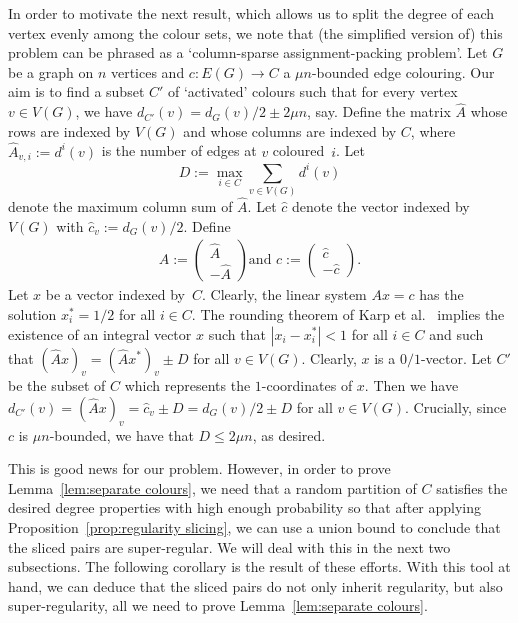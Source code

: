 \documentclass[10pt]{amsart}
\theoremstyle{definition}
\theoremstyle{claimstyle}
\theoremstyle{stepstyle}
\numberwithin{equation}{section}
\begin{document}
In order to motivate the next result, which allows us to split the degree of each vertex evenly among the colour sets, we note that (the simplified version of) this problem can be phrased as a `column-sparse assignment-packing problem'. Let $G$ be a graph on $n$ vertices and $c\colon E(G)\to C$ a $\mu n$-bounded edge colouring. Our aim is to find a subset $C'$ of `activated' colours such that for every vertex $v\in V(G)$, we have $d_{C'}(v)=d_G(v)/2\pm 2\mu n$, say.
Define the matrix $\hat{A}$ whose rows are indexed by $V(G)$ and whose columns are indexed by $C$, where $\hat{A}_{v,i}:=d^i(v)$ is the number of edges at $v$ coloured~$i$.
Let $$D:=\max_{i\in C}\sum_{v\in V(G)}d^i(v)$$ denote the maximum column sum of $\hat{A}$.
Let $\hat{c}$ denote the vector indexed by $V(G)$ with $\hat{c}_v:=d_G(v)/2$. Define 
\begin{align*}
	\text{$A:=
	\left(
	\begin{array}{c}
	\hat{A}\\
	-\hat{A}
	\end{array}
	\right)$
	and $c:=
	\left(
	\begin{array}{c}
	\hat{c}\\
	-\hat{c}
	\end{array}
\right)$.}
\end{align*}
Let $x$ be a vector indexed by~$C$.
Clearly, the linear system $Ax=c$ has the solution $x_i^\ast=1/2$ for all $i\in C$. The rounding theorem of Karp et al.~\cite{KLRTVV:87} implies the existence of an integral vector $x$ such that $|x_i-x^\ast_i|<1$ for all $i\in C$ and such that $(\hat{A}x)_v= (\hat{A} x^\ast)_v \pm D$ for all $v\in V(G)$. Clearly, $x$ is a $0/1$-vector.
Let $C'$ be the subset of $C$ which represents the $1$-coordinates of $x$. Then we have $d_{C'}(v)=(\hat{A}x)_v=\hat{c}_v\pm D=d_G(v)/2\pm D$ for all $v\in V(G)$. Crucially, since $c$ is $\mu n$-bounded, we have that $D\le 2\mu n$, as desired.

This is good news for our problem. However, in order to prove Lemma~\ref{lem:separate colours}, we need that a random partition of $C$ satisfies the desired degree properties with high enough probability so that after applying Proposition~\ref{prop:regularity slicing}, we can use a union bound to conclude that the sliced pairs are super-regular.
We will deal with this in the next two subsections.
The following corollary is the result of these efforts.
With this tool at hand, we can deduce that the sliced pairs do not only inherit regularity, but also super-regularity, all we need to prove Lemma~\ref{lem:separate colours}.
\end{document}
